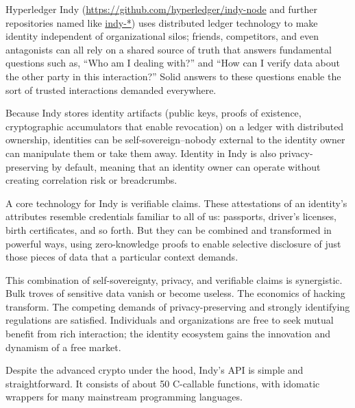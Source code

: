 Hyperledger Indy (\url{https://github.com/hyperledger/indy-node} and further repositories named like \url{indy-*}) uses distributed ledger technology to make identity independent of organizational silos; friends, competitors, and even antagonists can all rely on a shared source of truth that answers fundamental questions such as, “Who am I dealing with?” and “How can I verify data about the other party in this interaction?” Solid answers to these questions enable the sort of trusted interactions demanded everywhere.

Because Indy stores identity artifacts (public keys, proofs of existence, cryptographic accumulators that enable revocation) on a ledger with distributed ownership, identities can be self-sovereign--nobody external to the identity owner can manipulate them or take them away. Identity in Indy is also privacy-preserving by default, meaning that an identity owner can operate without creating correlation risk or breadcrumbs.

A core technology for Indy is verifiable claims. These attestations of an identity's attributes resemble credentials familiar to all of us: passports, driver’s licenses, birth certificates, and so forth. But they can be combined and transformed in powerful ways, using zero-knowledge proofs to enable selective disclosure of just those pieces of data that a particular context demands.

This combination of self-sovereignty, privacy, and verifiable claims is synergistic. Bulk troves of sensitive data vanish or become useless. The economics of hacking transform. The competing demands of privacy-preserving and strongly identifying regulations are satisfied. Individuals and organizations are free to seek mutual benefit from rich interaction; the identity ecosystem gains the innovation and dynamism of a free market. 

Despite the advanced crypto under the hood, Indy’s API is simple and straightforward. It consists of about 50 C-callable functions, with idomatic wrappers for many mainstream programming languages. 

